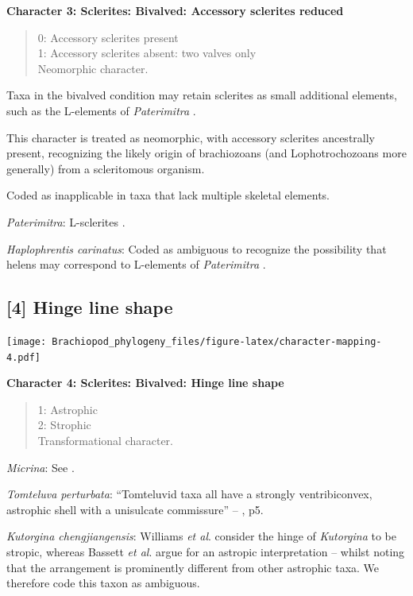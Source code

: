 \documentclass[]{book}
\theoremstyle{definition}
\theoremstyle{definition}
\theoremstyle{definition}
\theoremstyle{remark}
\begin{document}
\textbf{Character 3: Sclerites: Bivalved: Accessory sclerites reduced}

\begin{quote}
0: Accessory sclerites present\\
1: Accessory sclerites absent: two valves only\\
Neomorphic character.
\end{quote}

Taxa in the bivalved condition may retain sclerites as small additional
elements, such as the L-elements of \emph{Paterimitra}
\citep{Skovsted2015Theearly}.

This character is treated as neomorphic, with accessory sclerites
ancestrally present, recognizing the likely origin of brachiozoans (and
Lophotrochozoans more generally) from a scleritomous organism.

Coded as inapplicable in taxa that lack multiple skeletal elements.

\emph{Paterimitra}: L-sclerites \citep{Skovsted2009Thescleritome}.

\emph{Haplophrentis carinatus}: Coded as ambiguous to recognize the
possibility that helens may correspond to L-elements of
\emph{Paterimitra} \citep{Moysiuk2017Hyolithsare}.

\hypertarget{hinge-line-shape}{%
\subsection*{{[}4{]} Hinge line shape}\label{hinge-line-shape}}

\texttt{[image: Brachiopod\_phylogeny\_files/figure-latex/character-mapping-4.pdf]}

\textbf{Character 4: Sclerites: Bivalved: Hinge line shape}

\begin{quote}
1: Astrophic\\
2: Strophic\\
Transformational character.
\end{quote}

\emph{Micrina}: See \citet{Holmer2008TheEarly}.

\emph{Tomteluva perturbata}: ``Tomteluvid taxa all have a strongly
ventribiconvex, astrophic shell with a unisulcate commissure'' --
\citet{Streng2016Anew}, p5.

\emph{Kutorgina chengjiangensis}: Williams \emph{et al}.
\citeyearpar[p.~208]{Williams2000BrachiopodaLinguliformea} consider the
hinge of \emph{Kutorgina} to be stropic, whereas Bassett \emph{et al}.
\citeyearpar{Bassett2001Functionalmorphology} argue for an astropic
interpretation -- whilst noting that the arrangement is prominently
different from other astrophic taxa. We therefore code this taxon as
ambiguous.
\end{document}
